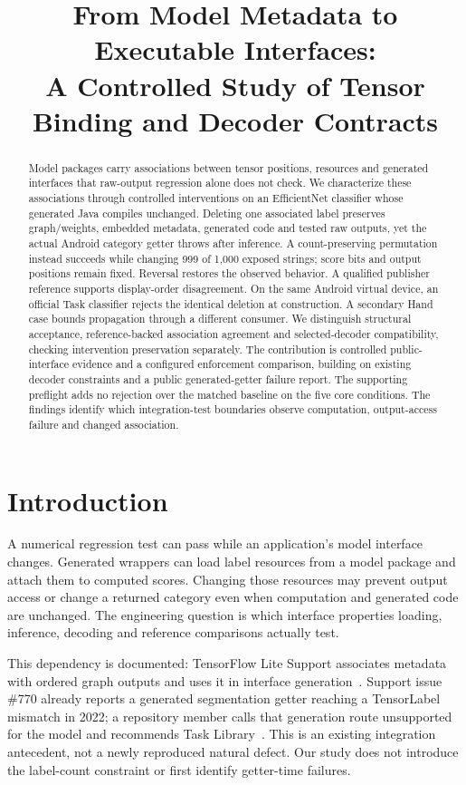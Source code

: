 \documentclass[10pt,conference]{IEEEtran}
\title{From Model Metadata to Executable Interfaces:\\A Controlled Study of Tensor Binding and Decoder Contracts}
\author{\IEEEauthorblockN{Anonymous author(s)}}
\begin{document}
\maketitle

\begin{abstract}
Model packages carry associations between tensor positions, resources and generated interfaces that raw-output regression alone does not check. We characterize these associations through controlled interventions on an EfficientNet classifier whose generated Java compiles unchanged. Deleting one associated label preserves graph/weights, embedded metadata, generated code and tested raw outputs, yet the actual Android category getter throws after inference. A count-preserving permutation instead succeeds while changing 999 of 1,000 exposed strings; score bits and output positions remain fixed. Reversal restores the observed behavior. A qualified publisher reference supports display-order disagreement. On the same Android virtual device, an official Task classifier rejects the identical deletion at construction. A secondary Hand case bounds propagation through a different consumer. We distinguish structural acceptance, reference-backed association agreement and selected-decoder compatibility, checking intervention preservation separately. The contribution is controlled public-interface evidence and a configured enforcement comparison, building on existing decoder constraints and a public generated-getter failure report. The supporting preflight adds no rejection over the matched baseline on the five core conditions. The findings identify which integration-test boundaries observe computation, output-access failure and changed association.
\end{abstract}

\section{Introduction}
A numerical regression test can pass while an application's model interface changes. Generated wrappers can load label resources from a model package and attach them to computed scores. Changing those resources may prevent output access or change a returned category even when computation and generated code are unchanged. The engineering question is which interface properties loading, inference, decoding and reference comparisons actually test.

This dependency is documented: TensorFlow Lite Support associates metadata with ordered graph outputs and uses it in interface generation~\cite{schema,codegen-doc}. Support issue \#770 already reports a generated segmentation getter reaching a TensorLabel mismatch in 2022; a repository member calls that generation route unsupported for the model and recommends Task Library~\cite{support770,support770reply}. This is an existing integration antecedent, not a newly reproduced natural defect. Our study does not introduce the label-count constraint or first identify getter-time failures.
\end{document}
